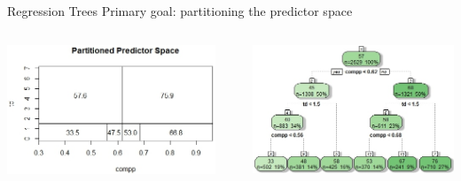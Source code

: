 \documentclass{beamer}
\begin{document}
	\begin{frame}{Regression Trees}
		Primary goal: partitioning the predictor space
		\vspace{20pt}
		\begin{columns}
			\begin{column}[t]{0.5\textwidth}
				\includegraphics[scale=.45]{expartspace.jpeg}
			\end{column}
			\begin{column}{0.08\textwidth}
			\end{column}
			\begin{column}[t]{\dimexpr\paperwidth-20pt}
				\includegraphics[scale=.5]{extree.jpeg}
			\end{column}
		\end{columns}
	\end{frame}
\end{document}
